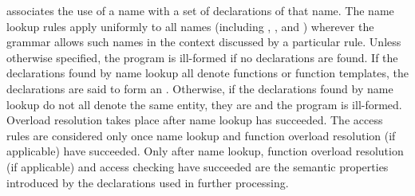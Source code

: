\pnum
{} associates the use of a name
with a set of declarations of that name.
The name lookup rules apply uniformly to all names (including
,
, and
) wherever the grammar allows
such names in the context discussed by a particular rule.
Unless otherwise specified,
the program is ill-formed if no declarations are found.
If the declarations found by name lookup
all denote functions or function templates,
the declarations are said to form an .
Otherwise,
if the declarations found by name lookup do not all denote the same entity,
%
they are  and the program is ill-formed.
Overload resolution
takes place after name lookup has succeeded. The access rules
are considered only once name lookup and
function overload resolution (if applicable) have succeeded. Only after
name lookup, function overload resolution (if applicable) and access
checking have succeeded
are the semantic properties introduced by the declarations
used in further processing.

